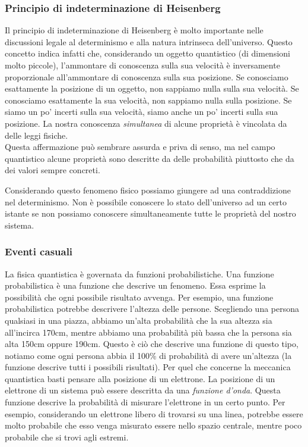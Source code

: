 \documentclass[a4paper, 12pt]{article}
\begin{document}
\subsubsection{Principio di indeterminazione di Heisenberg}

Il principio di indeterminazione di Heisenberg è molto importante nelle discussioni
legale al determinismo e alla natura intrinseca dell'universo.
Questo concetto indica infatti che, considerando un oggetto quantistico (di dimensioni molto piccole),
l'ammontare di conoscenza sulla sua velocità è inversamente proporzionale all'ammontare
di conoscenza sulla sua posizione.
Se conosciamo esattamente la posizione di un oggetto, non sappiamo nulla sulla sua velocità.
Se conosciamo esattamente la sua velocità, non sappiamo nulla sulla posizione. Se siamo un po'
incerti sulla sua velocità, siamo anche un po' incerti sulla sua posizione.
La nostra conoscenza \textit{simultanea} di alcune proprietà è vincolata da delle leggi fisiche. \\
Questa affermazione può sembrare assurda e priva di senso, ma nel campo quantistico
alcune proprietà sono descritte da delle probabilità piuttosto che da dei valori sempre concreti.

Considerando questo fenomeno fisico possiamo giungere ad una contraddizione nel determinismo.
Non è possibile conoscere lo stato dell'universo ad un certo istante se non possiamo
conoscere simultaneamente tutte le proprietà del nostro sistema.

\subsubsection{Eventi casuali}

La fisica quantistica è governata da funzioni probabilistiche.
Una funzione probabilistica è una funzione che descrive un fenomeno. Essa
esprime la possibilità che ogni possibile risultato avvenga. Per esempio,
una funzione probabilistica potrebbe descrivere l'altezza delle persone.
Scegliendo una persona qualsiasi in una piazza, abbiamo un'alta probabilità che la sua altezza
sia all'incirca 170cm, mentre abbiamo una probabilità più bassa che la persona sia alta 150cm oppure 190cm.
Questo è ciò che descrive una funzione di questo tipo, notiamo come ogni persona abbia il 100\% di probabilità
di avere un'altezza (la funzione descrive tutti i possibili risultati).
Per quel che concerne la meccanica quantistica basti pensare alla posizione di un elettrone. La posizione di un elettrone
di un sistema può essere descritta da una \textit{funzione d'onda}. Questa funzione descrive
la probabilità di misurare l'elettrone in un certo punto. Per esempio, considerando un elettrone libero
di trovarsi su una linea, potrebbe essere molto probabile che esso venga misurato essere nello spazio centrale, mentre
poco probabile che si trovi agli estremi.
\end{document}
